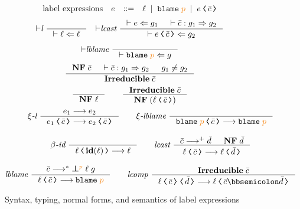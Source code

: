 \begin{figure}[tbp]
\raggedright
  \[
  \begin{array}{rcll}
    \text{label expressions} & e & ::= & \ell \MID \blame{p} \MID \cccast{e}{\bar{c}} \\
  \end{array}
  \]
  {\small
  \begin{gather*}
    {\vdash}\textit{l}~
    \inference{}{\vdash \ell \Leftarrow \ell}
    \quad
    {\vdash}\textit{lcast}~
    \inference{\vdash e \Leftarrow g_1 & \vdash \bar{c} : g_1 \Rightarrow g_2}
    {\vdash \cccast{e}{\bar{c}} \Leftarrow g_2}
    \\[1ex]
    {\vdash}\textit{lblame}~
    \inference{}
    {\vdash \blame{p} \Leftarrow g}
  \end{gather*}}
  {\small
    \begin{gather*}
      \inference{\mathbf{NF} \; \bar{c} & \vdash \bar{c} : g_1 \Rightarrow g_2 & g_1 \neq g_2}
                {\mathbf{Irreducible} \; \bar{c}}
  \end{gather*}}
  {\small
  \begin{gather*}
  \inference{}{\mathbf{NF} \; \ell}
  \qquad
  \inference{\mathbf{Irreducible} \; \bar{c}}{\mathbf{NF} \; (\cccast{\ell}{\bar{c}})}
  \end{gather*}}
  {\small
  \begin{gather*}
  \xi\textit{-l}~
  \inference{e_1 \longrightarrow e_2}
  {\cccast{e_1}{\bar{c}} \longrightarrow \cccast{e_2}{\bar{c}}}
  \qquad
  \xi\textit{-lblame}~
  \inference{}{\cccast{\blame{p}}{\bar{c}} \longrightarrow \blame{p}}
  \\[2ex]
  \beta\textit{-id}~
  \inference{}{\cccast{\ell}{\id{\ell}} \longrightarrow \ell}
  \qquad
  \textit{lcast}~
  \inference{\bar{c} \longrightarrow^{+} \bar{d} & \mathbf{NF} \; \bar{d}}
  {\cccast{\ell}{\bar{c}} \longrightarrow \cccast{\ell}{\bar{d}}}
  \\[2ex]
  \textit{lblame}~
  \inference{\bar{c} \longrightarrow^{*} \err{\ell}{g}{p}}
  {\cccast{\ell}{\bar{c}} \longrightarrow \blame{p}}
  \qquad
  \textit{lcomp}~
  \inference{\mathbf{Irreducible} \; \bar{c}}
  {\cccast{\cccast{\ell}{\bar{c}}}{\bar{d}} \longrightarrow \cccast{\ell}{\bar{c} \mdoubleplus \bar{d}}}
  \end{gather*}}
  \caption{Syntax, typing, normal forms, and semantics of label expressions}
  \label{fig:lexpr}
\end{figure}

